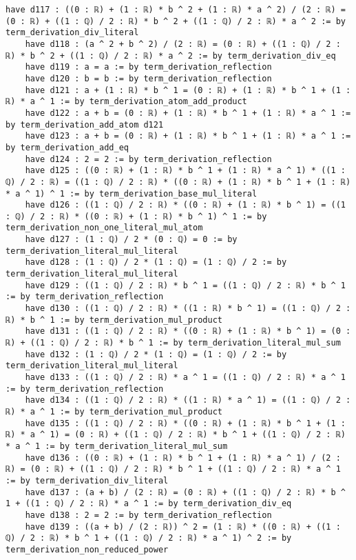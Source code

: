 \documentclass{article}
\begin{document}
\begin{tcolorbox}[colback=white!10, width=\linewidth]
\begin{lstlisting}[language=Lean4]
    have d117 : ((0 : ℝ) + (1 : ℝ) * b ^ 2 + (1 : ℝ) * a ^ 2) / (2 : ℝ) = (0 : ℝ) + ((1 : ℚ) / 2 : ℝ) * b ^ 2 + ((1 : ℚ) / 2 : ℝ) * a ^ 2 := by term_derivation_div_literal
    have d118 : (a ^ 2 + b ^ 2) / (2 : ℝ) = (0 : ℝ) + ((1 : ℚ) / 2 : ℝ) * b ^ 2 + ((1 : ℚ) / 2 : ℝ) * a ^ 2 := by term_derivation_div_eq
    have d119 : a = a := by term_derivation_reflection
    have d120 : b = b := by term_derivation_reflection
    have d121 : a + (1 : ℝ) * b ^ 1 = (0 : ℝ) + (1 : ℝ) * b ^ 1 + (1 : ℝ) * a ^ 1 := by term_derivation_atom_add_product
    have d122 : a + b = (0 : ℝ) + (1 : ℝ) * b ^ 1 + (1 : ℝ) * a ^ 1 := by term_derivation_add_atom d121
    have d123 : a + b = (0 : ℝ) + (1 : ℝ) * b ^ 1 + (1 : ℝ) * a ^ 1 := by term_derivation_add_eq
    have d124 : 2 = 2 := by term_derivation_reflection
    have d125 : ((0 : ℝ) + (1 : ℝ) * b ^ 1 + (1 : ℝ) * a ^ 1) * ((1 : ℚ) / 2 : ℝ) = ((1 : ℚ) / 2 : ℝ) * ((0 : ℝ) + (1 : ℝ) * b ^ 1 + (1 : ℝ) * a ^ 1) ^ 1 := by term_derivation_base_mul_literal
    have d126 : ((1 : ℚ) / 2 : ℝ) * ((0 : ℝ) + (1 : ℝ) * b ^ 1) = ((1 : ℚ) / 2 : ℝ) * ((0 : ℝ) + (1 : ℝ) * b ^ 1) ^ 1 := by term_derivation_non_one_literal_mul_atom
    have d127 : (1 : ℚ) / 2 * (0 : ℚ) = 0 := by term_derivation_literal_mul_literal
    have d128 : (1 : ℚ) / 2 * (1 : ℚ) = (1 : ℚ) / 2 := by term_derivation_literal_mul_literal
    have d129 : ((1 : ℚ) / 2 : ℝ) * b ^ 1 = ((1 : ℚ) / 2 : ℝ) * b ^ 1 := by term_derivation_reflection
    have d130 : ((1 : ℚ) / 2 : ℝ) * ((1 : ℝ) * b ^ 1) = ((1 : ℚ) / 2 : ℝ) * b ^ 1 := by term_derivation_mul_product
    have d131 : ((1 : ℚ) / 2 : ℝ) * ((0 : ℝ) + (1 : ℝ) * b ^ 1) = (0 : ℝ) + ((1 : ℚ) / 2 : ℝ) * b ^ 1 := by term_derivation_literal_mul_sum
    have d132 : (1 : ℚ) / 2 * (1 : ℚ) = (1 : ℚ) / 2 := by term_derivation_literal_mul_literal
    have d133 : ((1 : ℚ) / 2 : ℝ) * a ^ 1 = ((1 : ℚ) / 2 : ℝ) * a ^ 1 := by term_derivation_reflection
    have d134 : ((1 : ℚ) / 2 : ℝ) * ((1 : ℝ) * a ^ 1) = ((1 : ℚ) / 2 : ℝ) * a ^ 1 := by term_derivation_mul_product
    have d135 : ((1 : ℚ) / 2 : ℝ) * ((0 : ℝ) + (1 : ℝ) * b ^ 1 + (1 : ℝ) * a ^ 1) = (0 : ℝ) + ((1 : ℚ) / 2 : ℝ) * b ^ 1 + ((1 : ℚ) / 2 : ℝ) * a ^ 1 := by term_derivation_literal_mul_sum
    have d136 : ((0 : ℝ) + (1 : ℝ) * b ^ 1 + (1 : ℝ) * a ^ 1) / (2 : ℝ) = (0 : ℝ) + ((1 : ℚ) / 2 : ℝ) * b ^ 1 + ((1 : ℚ) / 2 : ℝ) * a ^ 1 := by term_derivation_div_literal
    have d137 : (a + b) / (2 : ℝ) = (0 : ℝ) + ((1 : ℚ) / 2 : ℝ) * b ^ 1 + ((1 : ℚ) / 2 : ℝ) * a ^ 1 := by term_derivation_div_eq
    have d138 : 2 = 2 := by term_derivation_reflection
    have d139 : ((a + b) / (2 : ℝ)) ^ 2 = (1 : ℝ) * ((0 : ℝ) + ((1 : ℚ) / 2 : ℝ) * b ^ 1 + ((1 : ℚ) / 2 : ℝ) * a ^ 1) ^ 2 := by term_derivation_non_reduced_power

\end{lstlisting}
\end{tcolorbox}
\end{document}
